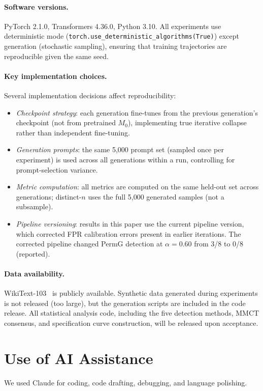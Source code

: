 \paragraph{Software versions.}
PyTorch 2.1.0, Transformers 4.36.0, Python 3.10.
All experiments use deterministic mode (\texttt{torch.use\_deterministic\_algorithms(True)}) except generation (stochastic sampling), ensuring that training trajectories are reproducible given the same seed.

\paragraph{Key implementation choices.}
Several implementation decisions affect reproducibility:
\begin{itemize}
\item \emph{Checkpoint strategy}: each generation fine-tunes from the previous generation's checkpoint (not from pretrained $M_0$), implementing true iterative collapse rather than independent fine-tuning.
\item \emph{Generation prompts}: the same 5{,}000 prompt set (sampled once per experiment) is used across all generations within a run, controlling for prompt-selection variance.
\item \emph{Metric computation}: all metrics are computed on the same held-out set across generations; distinct-$n$ uses the full 5{,}000 generated samples (not a subsample).
\item \emph{Pipeline versioning}: results in this paper use the current pipeline version, which corrected FPR calibration errors present in earlier iterations. The corrected pipeline changed PermG detection at $\alpha{=}0.60$ from 3/8 to 0/8 (reported).
\end{itemize}

\paragraph{Data availability.}
WikiText-103~\citep{merity2017pointer} is publicly available.
Synthetic data generated during experiments is not released (too large), but the generation scripts are included in the code release.
All statistical analysis code, including the five detection methods, MMCT consensus, and specification curve construction, will be released upon acceptance.

\section*{Use of AI Assistance}

We used Claude for coding, code drafting, debugging, and language polishing.

